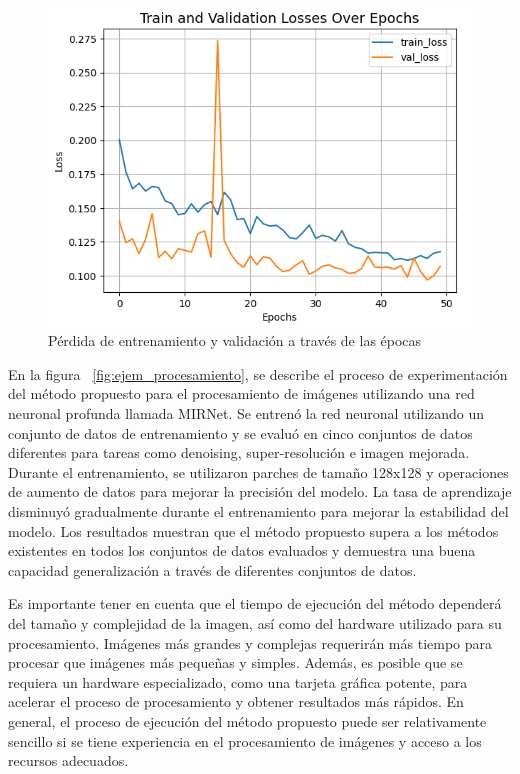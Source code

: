 \documentclass[a4paper,
               ]{jacow}
\begin{document}
\begin{figure}[!h]
    \centering
    \includegraphics*[width=.5\textwidth]{ll-train-losses-ep}
    \caption{Pérdida de entrenamiento y validación a través de las épocas}
    \label{fig:ll_train_losses_ep}
\end{figure}

En la figura ~\ref{fig:ejem_procesamiento}, se describe el proceso de experimentación del método propuesto para el procesamiento de imágenes utilizando una red neuronal profunda llamada MIRNet. Se entrenó la red neuronal utilizando un conjunto de datos de entrenamiento y se evaluó en cinco conjuntos de datos diferentes para tareas como denoising, super-resolución e imagen mejorada. Durante el entrenamiento, se utilizaron parches de tamaño 128x128 y operaciones de aumento de datos para mejorar la precisión del modelo. La tasa de aprendizaje disminuyó gradualmente durante el entrenamiento para mejorar la estabilidad del modelo. Los resultados muestran que el método propuesto supera a los métodos existentes en todos los conjuntos de datos evaluados y demuestra una buena capacidad generalización a través de diferentes conjuntos de datos.


Es importante tener en cuenta que el tiempo de ejecución del método dependerá del tamaño y complejidad de la imagen, así como del hardware utilizado para su procesamiento. Imágenes más grandes y complejas requerirán más tiempo para procesar que imágenes más pequeñas y simples. Además, es posible que se requiera un hardware especializado, como una tarjeta gráfica potente, para acelerar el proceso de procesamiento y obtener resultados más rápidos. En general, el proceso de ejecución del método propuesto puede ser relativamente sencillo si se tiene experiencia en el procesamiento de imágenes y acceso a los recursos adecuados.

\end{document}
